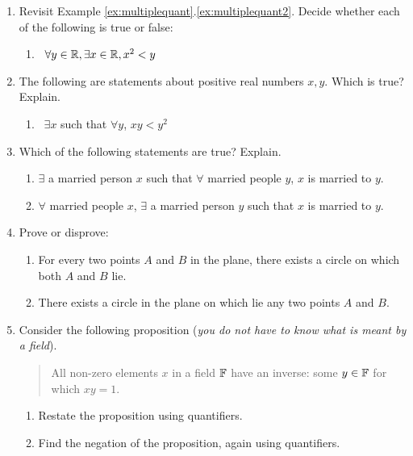 \begin{exercises}{}{}
\begin{enumerate}
	  
	  \goodbreak
	  
	  
	  \item Revisit Example \ref*{ex:multiplequant}.\ref{ex:multiplequant2}. Decide whether each of the following is true or false:
	  \begin{enumerate}
		  \item {} \ $\forall y\in\mathbb{R},\exists x\in\mathbb{R},x^2<y$
		\end{enumerate}
	
	  
		\item The following are statements about positive real numbers $x,y$. Which is true? Explain.
		\begin{enumerate}
		  \item {} \ $\exists x$ such that $\forall y$, $xy<y^2$
		\end{enumerate}
	
	
		\item Which of the following statements are true? Explain.
		\begin{enumerate}
		  \item $\exists$ a married person $x$ such that $\forall$ married people $y$, $x$ is married to $y$.
		  \item $\forall$ married people $x$, $\exists$ a married person $y$ such that $x$ is married to $y$.
		\end{enumerate}
		
		
		\item Prove or disprove:
		\begin{enumerate}
		  \item For every two points $A$ and $B$ in the plane, there exists a circle on which both $A$ and $B$ lie.
		  \item There exists a circle in the plane on which lie any two points $A$ and $B$.
		\end{enumerate}
	  
	  
		\item Consider the following proposition (\emph{you do not have to know what is meant by a field}).
		\begin{quote}
			All non-zero elements $x$ in a field $\mathbb{F}$ have an inverse: some $y\in\mathbb{F}$ for which $xy=1$.
		\end{quote}
		\begin{enumerate}
		  \item Restate the proposition using quantifiers.
		  \item Find the negation of the proposition, again using quantifiers.
		\end{enumerate}
			

\end{enumerate}
\end{exercises}
